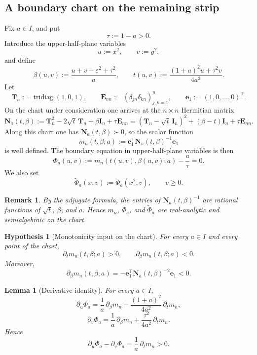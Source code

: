 \documentclass[11pt]{article}
\newtheorem{lemma}[theorem]{Lemma}
\newtheorem{remark}[theorem]{Remark}
\newtheorem{hypothesis}[theorem]{Hypothesis}
\DeclareMathOperator{\tridiag}{tridiag}
\begin{document}
\subsection*{A boundary chart on the remaining strip}

Fix \(a\in I\), and put
\[
\tau:=1-a>0.
\]
Introduce the upper-half-plane variables
\[
u:=x^2,\qquad v:=y^2,
\]
and define
\[
\beta(u,v):=\frac{u+v-\varepsilon^2+\tau^2}{a},
\qquad
t(u,v):=\frac{(1+a)^2u+\tau^2v}{4a^2}.
\]
Let
\[
\mathbf T_n:=\tridiag(1,0,1),
\qquad
\mathbf E_{nn}:=(\delta_{jn}\delta_{kn})_{j,k=1}^n,
\qquad
\mathbf e_1:=(1,0,\dots,0)^{\mathsf T}.
\]
On the chart under consideration one arrives at the \(n\times n\) Hermitian matrix
\[
\mathbf N_a(t,\beta)
:=
\mathbf T_n^2-2\sqrt t\,\mathbf T_n+\beta\mathbf I_n+\tau\mathbf E_{nn}
=
(\mathbf T_n-\sqrt t\,\mathbf I_n)^2+(\beta-t)\mathbf I_n+\tau\mathbf E_{nn}.
\]
Along this chart one has \(\mathbf N_a(t,\beta)\succ 0\), so the scalar function
\[
m_n(t,\beta;a)
:=
\mathbf e_1^{\mathsf T}\mathbf N_a(t,\beta)^{-1}\mathbf e_1
\]
is well defined. The boundary equation in upper-half-plane variables is then
\[
\Phi_a(u,v)
:=
m_n(t(u,v),\beta(u,v);a)-\frac{a}{\tau}
=
0.
\]
We also set
\[
\widetilde\Phi_a(x,v):=\Phi_a(x^2,v),
\qquad v\ge 0.
\]

\begin{remark}\label{rem:rational}
By the adjugate formula, the entries of \(\mathbf N_a(t,\beta)^{-1}\) are rational functions of \(\sqrt t\), \(\beta\), and \(a\). Hence \(m_n\), \(\Phi_a\), and \(\widetilde\Phi_a\) are real-analytic and semialgebraic on the chart.
\end{remark}

\begin{hypothesis}[Monotonicity input on the chart]\label{hyp:monotone-m}
For every \(a\in I\) and every point of the chart,
\[
\partial_t m_n(t,\beta;a)>0,
\qquad
\partial_\beta m_n(t,\beta;a)<0.
\]
Moreover,
\[
\partial_\beta m_n(t,\beta;a)
=
-\mathbf e_1^{\mathsf T}\mathbf N_a(t,\beta)^{-2}\mathbf e_1<0.
\]
\end{hypothesis}

\begin{lemma}[Derivative identity]\label{lem:derivative-identity}
For every \(a\in I\),
\[
\partial_u\Phi_a
=
\frac1a\,\partial_\beta m_n
+
\frac{(1+a)^2}{4a^2}\,\partial_t m_n,
\]
\[
\partial_v\Phi_a
=
\frac1a\,\partial_\beta m_n
+
\frac{\tau^2}{4a^2}\,\partial_t m_n.
\]
Hence
\[
\partial_u\Phi_a-\partial_v\Phi_a
=
\frac1a\,\partial_t m_n
>0.
\]
\end{lemma}
\end{document}

